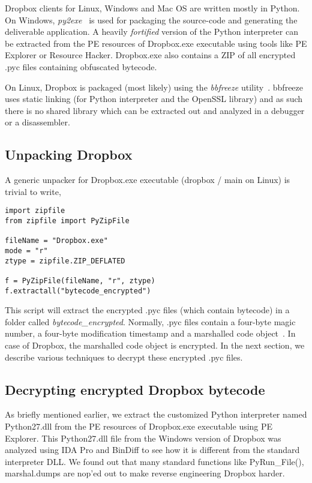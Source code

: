 \documentclass[letterpaper,twocolumn,10pt]{article}
\begin{document}
Dropbox clients for Linux, Windows and Mac OS are written mostly in Python. On
Windows, \emph{py2exe}~\cite{py2exe} is used for packaging the source-code and
generating the deliverable application. A heavily \emph{fortified} version of
the Python interpreter can be extracted from the PE resources of Dropbox.exe
executable using tools like PE Explorer or Resource Hacker. Dropbox.exe also
contains a ZIP of all encrypted .pyc files containing obfuscated bytecode.

On Linux, Dropbox is packaged (most likely) using the \emph{bbfreeze}
utility~\cite{bbfreeze}. bbfreeze uses static linking (for Python interpreter
and the OpenSSL library) and as such there is no shared library which can be
extracted out and analyzed in a debugger or a disassembler.

\subsection{Unpacking Dropbox}

A generic unpacker for Dropbox.exe executable (dropbox / main on Linux) is
trivial to write,

\begin{verbatim}
import zipfile
from zipfile import PyZipFile

fileName = "Dropbox.exe"
mode = "r"
ztype = zipfile.ZIP_DEFLATED

f = PyZipFile(fileName, "r", ztype)
f.extractall("bytecode_encrypted")
\end{verbatim}

This script will extract the encrypted .pyc files (which contain bytecode) in a
folder called \emph{bytecode\_encrypted}. Normally, .pyc files contain a
four-byte magic number, a four-byte modification timestamp and a marshalled
code object~\cite{nedbatchelder}. In case of Dropbox, the marshalled code
object is encrypted. In the next section, we describe various techniques to
decrypt these encrypted .pyc files.

\subsection{Decrypting encrypted Dropbox bytecode}

As briefly mentioned earlier, we extract the customized Python interpreter
named Python27.dll from the PE resources of Dropbox.exe executable using PE
Explorer. This Python27.dll file from the Windows version of Dropbox was
analyzed using IDA Pro and BinDiff to see how it is different from the standard
interpreter DLL. We found out that many standard functions like PyRun\_File(),
marshal.dumps are nop'ed out to make reverse engineering Dropbox harder.
\end{document}
